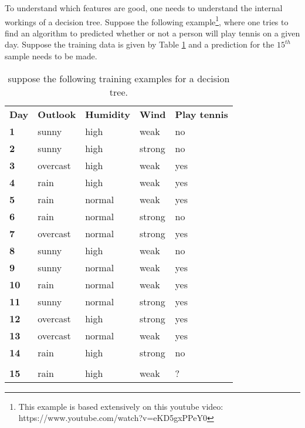 
\npar

To understand which features are good, one needs to understand the internal workings of a decision tree. Suppose the following example\footnote{This example is based extensively on this youtube video: https://www.youtube.com/watch?v=eKD5gxPPeY0}, where one tries to find an algorithm to predicted whether or not a person will play tennis on a given day. Suppose the training data is given by Table \ref{decisionTreeTable} and a prediction for the $15^{th}$ sample needs to be made.

\begin{table}[H]
\centering
\caption{suppose the following training examples for a decision tree.}
\label{decisionTreeTable}
\begin{tabular}{lllll}
\textbf{Day} & \textbf{Outlook} & \textbf{Humidity} & \textbf{Wind} & \textbf{Play tennis} \\
\textbf{1}   & sunny            & high              & weak          & no                   \\
\textbf{2}   & sunny            & high              & strong        & no                   \\
\textbf{3}   & overcast         & high              & weak          & yes                  \\
\textbf{4}   & rain             & high              & weak          & yes                  \\
\textbf{5}   & rain             & normal            & weak          & yes                  \\
\textbf{6}   & rain             & normal            & strong        & no                   \\
\textbf{7}   & overcast         & normal            & strong        & yes                  \\
\textbf{8}   & sunny            & high              & weak          & no                   \\
\textbf{9}   & sunny            & normal            & weak          & yes                  \\
\textbf{10}  & rain             & normal            & weak          & yes                  \\
\textbf{11}  & sunny            & normal            & strong        & yes                  \\
\textbf{12}  & overcast         & high              & strong        & yes                  \\
\textbf{13}  & overcast         & normal            & weak          & yes                  \\
\textbf{14}  & rain             & high              & strong        & no                   \\
             &                  &                   &               &                      \\
\textbf{15}  & rain             & high              & weak          & ?                   
\end{tabular}
\end{table}

